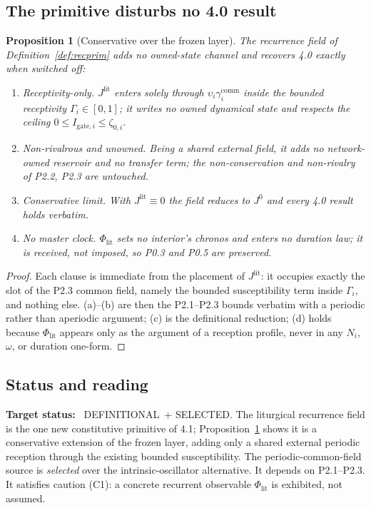 \documentclass[11pt,a4paper]{article}
\newcommand{\stDef}{\textcolor{cDef}{\textsf{\small DEFINITIONAL}}}
\newcommand{\stSelected}{\textcolor{cSel}{\textsf{\small SELECTED}}}
\theoremstyle{definition}
\theoremstyle{plain}
\newtheorem{proposition}[definition]{Proposition}
\theoremstyle{remark}
\begin{document}
\subsection{The primitive disturbs no 4.0 result}

\begin{proposition}[Conservative over the frozen layer]\label{prop:phi0cons}
The recurrence field of Definition~\ref{def:recprim} adds no owned-state channel and recovers
4.0 exactly when switched off:
\begin{enumerate}[label=\textup{(\alph*)},leftmargin=1.2cm]
\item \emph{Receptivity-only.} \(J^{\mathrm{lit}}\) enters solely through
\(\upsilon_i\gamma_i^{\mathrm{comm}}\) inside the bounded receptivity \(\Gamma_i\in[0,1]\);
it writes no owned dynamical state and respects the ceiling
\(0\le I_{\mathrm{gate},i}\le\zeta_{0,i}\).
\item \emph{Non-rivalrous and unowned.} Being a shared external field, it adds no
network-owned reservoir and no transfer term; the non-conservation and non-rivalry of P2.2,
P2.3 are untouched.
\item \emph{Conservative limit.} With \(J^{\mathrm{lit}}\equiv0\) the field reduces to
\(J^0\) and every 4.0 result holds verbatim.
\item \emph{No master clock.} \(\Phi_{\mathrm{lit}}\) sets no interior's chronos and enters no
duration law; it is received, not imposed, so P0.3 and P0.5 are preserved.
\end{enumerate}
\end{proposition}

\begin{proof}
Each clause is immediate from the placement of \(J^{\mathrm{lit}}\): it occupies exactly the
slot of the P2.3 common field, namely the bounded susceptibility term inside \(\Gamma_i\),
and nothing else. (a)--(b) are then the P2.1--P2.3 bounds verbatim with a periodic rather than
aperiodic argument; (c) is the definitional reduction; (d) holds because \(\Phi_{\mathrm{lit}}\)
appears only as the argument of a reception profile, never in any \(N_i\), \(\omega\), or
duration one-form. \qedhere
\end{proof}

\subsection{Status and reading}

\textbf{Target status:}~
\stDef\ + \stSelected. The liturgical recurrence field is the one new constitutive primitive
of 4.1; Proposition~\ref{prop:phi0cons} shows it is a conservative extension of the frozen
layer, adding only a shared external periodic reception through the existing bounded
susceptibility. The periodic-common-field source is \emph{selected} over the intrinsic-oscillator
alternative. It depends on P2.1--P2.3. It satisfies caution (C1): a concrete recurrent
observable \(\Phi_{\mathrm{lit}}\) is exhibited, not assumed.
\end{document}
